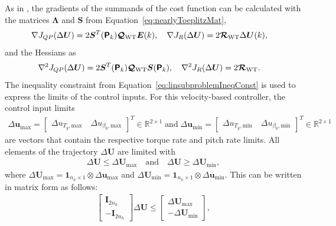 As in \cite{gonzalez2020nonlinear}, the gradients of the summands of the cost function can be calculated with the matrices $\bm{\Lambda}$ and $\bm{S}$ from Equation~\eqref{eq:nearlyToeplitzMat},
\begin{align*}
    \nabla J_{QP}(\Delta \bm{U}) &= 2\bm{S}^T(\bm{\mathsf{P}}_k) \bm{\mathcal{Q}}_{\text{WT}} \bm{E}(k),\quad
    \nabla J_R(\Delta \bm{U}) = 2 \bm{\mathcal{R}}_{\text{WT}} \Delta \bm{U}(k),
\end{align*}
and the Hessians as
\begin{align*}
    \nabla^2 J_{QP}(\Delta \bm{U}) &= 2\bm{S}^T(\bm{\mathsf{P}}_k) \bm{\mathcal{Q}}_{\text{WT}} \bm{S}(\bm{\mathsf{P}}_k),\quad
    \nabla^2 J_R(\Delta \bm{U}) = 2 \bm{\mathcal{R}}_{\text{WT}}.
\end{align*}
The inequality constraint from Equation~\eqref{eq:linsubproblemIneqConst} is used to express the limits of the control inputs. For this velocity-based controller, the control input limits
\begin{align*}
    \Delta \bm{u}_{\text{max}} = \begin{bmatrix} \Delta u_{T_g, \text{max}} \quad \Delta u_{\beta_0, \text{max}} \end{bmatrix}^T \in \mathbb{R}^{2 \times 1} \; \text{and}\;
    \Delta \bm{u}_{\text{min}} = \begin{bmatrix} \Delta u_{T_g, \text{min}} \quad \Delta u_{\beta_0, \text{min}} \end{bmatrix}^T \in \mathbb{R}^{2 \times 1}
\end{align*}
are vectors that contain the respective torque rate and pitch rate limits. All elements of the trajectory $\Delta \bm{U}$ are limited with
\begin{align*}
    \Delta \bm{U} \leq \Delta \bm{U}_{\text{max}} \quad \text{and} \quad \Delta \bm{U} \geq \Delta \bm{U}_{\text{min}},
\end{align*}
where $\Delta \bm{U}_{\text{max}} = \bm{1}_{n_h \times 1}\otimes \Delta \bm{u}_{\text{max}}$ and $\Delta \bm{U}_{\text{min}} = \bm{1}_{n_h \times 1}\otimes \Delta \bm{u}_{\text{min}}$.
This can be written in matrix form as follows:
\begin{align*}
    \begin{bmatrix}
        \bm{I}_{2n_h} \\
        -\bm{I}_{2n_h}
    \end{bmatrix} \Delta \bm{U} \leq
    \begin{bmatrix}
        \Delta \bm{U}_{\text{max}} \\
        -\Delta \bm{U}_{\text{min}}\end{bmatrix},
\end{align*}
